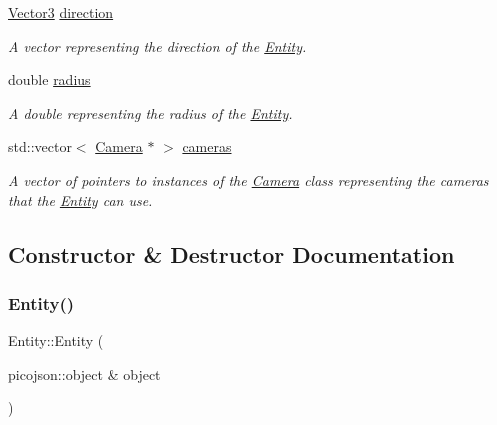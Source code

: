 \begin{DoxyCompactItemize}
\mbox{\label{classEntity_a0cbd80b9c5246037b94addee1730c41d}} 
\hyperlink{classVector3}{Vector3} \hyperlink{classEntity_a0cbd80b9c5246037b94addee1730c41d}{direction}
\begin{DoxyCompactList}\small\item\em A vector representing the direction of the \hyperlink{classEntity}{Entity}. \end{DoxyCompactList}\item 
\mbox{\label{classEntity_a610ded8f251ca7e837de4497821667e5}} 
double \hyperlink{classEntity_a610ded8f251ca7e837de4497821667e5}{radius}
\begin{DoxyCompactList}\small\item\em A double representing the radius of the \hyperlink{classEntity}{Entity}. \end{DoxyCompactList}\item 
\mbox{\label{classEntity_a1745d1d05834aab29e1591a3a0b1877d}} 
std\+::vector$<$ \hyperlink{classCamera}{Camera} $\ast$ $>$ \hyperlink{classEntity_a1745d1d05834aab29e1591a3a0b1877d}{cameras}
\begin{DoxyCompactList}\small\item\em A vector of pointers to instances of the \hyperlink{classCamera}{Camera} class representing the cameras that the \hyperlink{classEntity}{Entity} can use. \end{DoxyCompactList}\end{DoxyCompactItemize}


\subsection{Constructor \& Destructor Documentation}
\mbox{\label{classEntity_adce4e08d76d3bfcb9703d29e7e03c145}} 
\subsubsection{\texorpdfstring{Entity()}{Entity()}\hspace{0.1cm}{\footnotesize\ttfamily [1/2]}}
{\footnotesize\ttfamily Entity\+::\+Entity (\begin{DoxyParamCaption}\item[{picojson\+::object \&}]{object }\end{DoxyParamCaption})\hspace{0.3cm}{\ttfamily [inline]}}



